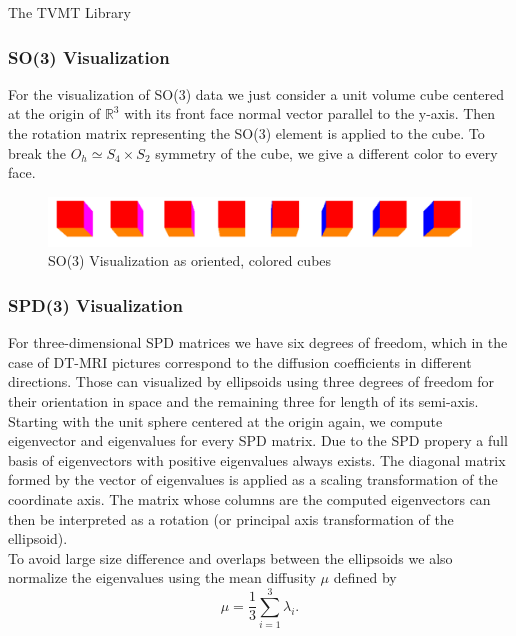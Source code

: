 \begin{chapter}{The TVMT Library}
\subsubsection{SO(3) Visualization} %
\label{ssub:SO(3) Visualization}
For the visualization of SO(3) data we just consider a unit volume cube centered at the origin of $\mathbb{R}^3$ with its front face normal vector parallel to the y-axis.
Then the rotation matrix representing the SO(3) element is applied to the cube. To break the $O_h \simeq S_4\times S_2$ symmetry of the cube, we give a different color to
every face.

\begin{figure}[h!]
        \centering
	    \includegraphics[width=0.8\linewidth]{./figures/library/cubes.pdf}
	    \caption[SO(3) cube visualization]{SO(3) Visualization as oriented, colored cubes}
	\label{fig:cube_visualization}
\end{figure}

\subsubsection{SPD(3) Visualization} %
\label{ssub:SPD(3) Visualization}
For three-dimensional SPD matrices we have six degrees of freedom, which in the case of DT-MRI pictures correspond to the diffusion coefficients in different directions.
Those can visualized by ellipsoids using three degrees of freedom for their orientation in space and the remaining three for length of its semi-axis.\\
Starting with the unit sphere centered at the origin again, we compute eigenvector and eigenvalues for every SPD matrix. Due to the SPD propery a full basis of eigenvectors
with positive eigenvalues always exists. The diagonal matrix formed by the vector of eigenvalues is applied as a scaling transformation of the coordinate axis. The matrix
whose columns are the computed eigenvectors can then be interpreted as a rotation (or principal axis transformation of the ellipsoid).\\
To avoid large size difference and overlaps between the ellipsoids we also normalize the eigenvalues using the mean diffusity $\mu$ defined by
\begin{equation}
    \mu = \frac{1}{3} \sum_{i=1}^{3}\lambda_i.
\end{equation}


\end{chapter}
